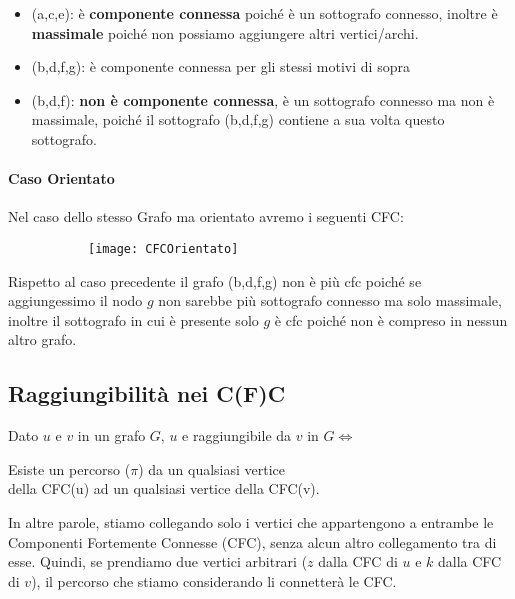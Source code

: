 \begin{itemize}
	\item (a,c,e): è \textbf{componente connessa} poiché è un sottografo connesso, inoltre è \textbf{massimale} poiché non possiamo aggiungere altri vertici/archi.\smallskip
	
	\item (b,d,f,g): è componente connessa per gli stessi motivi di sopra \smallskip
	
	\item (b,d,f): \textbf{non è componente connessa}, è un sottografo 
	connesso ma non è massimale, poiché il sottografo (b,d,f,g) contiene a sua volta questo sottografo.
\end{itemize}

\paragraph{Caso Orientato} Nel caso dello stesso Grafo ma orientato avremo i seguenti CFC:
\begin{figure}[H]
    \centering
    \begin{subfigure}[b]{0.35\textwidth}
        \texttt{[image: CFCOrientato]} 
    \end{subfigure}
\end{figure}
Rispetto al caso precedente il grafo (b,d,f,g) non è più cfc poiché se aggiungessimo il nodo $g$ non sarebbe più sottografo connesso ma solo massimale, inoltre il sottografo in cui è presente solo $g$ è cfc poiché non è compreso in nessun altro grafo.

\subsection{Raggiungibilità nei C(F)C}

Dato $u$ e $v$ in un grafo $G$, $u$ e raggiungibile da $v$ in $G \iff$ 
\smallskip

\begin{center}
	Esiste un percorso ($\pi$) da un qualsiasi vertice \\della CFC(u) ad un qualsiasi vertice della CFC(v).
\end{center}\bigskip

In altre parole, stiamo collegando solo i vertici che appartengono a entrambe le Componenti Fortemente Connesse (CFC), senza alcun altro collegamento tra di esse. Quindi, se prendiamo due vertici arbitrari ($z$  dalla CFC di $u$ e $k$ dalla CFC di $v$), il percorso che stiamo considerando li connetterà le CFC.\smallskip

